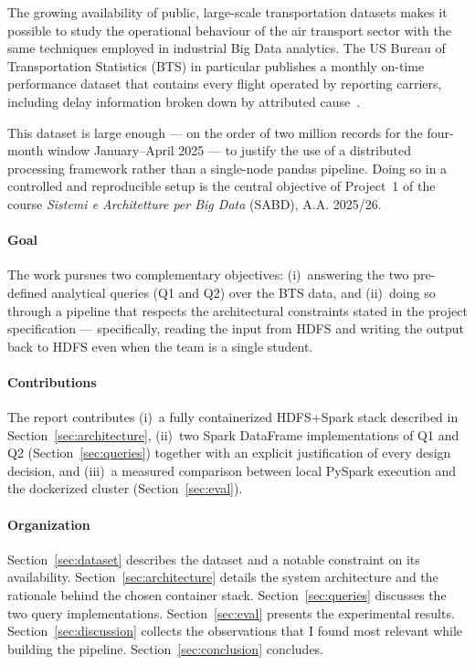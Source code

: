 \documentclass[conference]{IEEEtran}
\begin{document}
The growing availability of public, large-scale transportation
datasets makes it possible to study the operational behaviour of
the air transport sector with the same techniques employed in
industrial Big Data analytics. The US Bureau of Transportation
Statistics (BTS) in particular publishes a monthly on-time
performance dataset that contains every flight operated by
reporting carriers, including delay information broken down by
attributed cause~\cite{bts}.

This dataset is large enough --- on the order of two million
records for the four-month window January--April 2025 --- to
justify the use of a distributed processing framework rather than a
single-node pandas pipeline. Doing so in a controlled and
reproducible setup is the central objective of Project~1 of the
course \emph{Sistemi e Architetture per Big Data} (SABD),
A.A. 2025/26.

\paragraph{Goal}
The work pursues two complementary objectives: (i)~answering the
two pre-defined analytical queries (Q1 and Q2) over the BTS data,
and (ii)~doing so through a pipeline that respects the
architectural constraints stated in the project specification ---
specifically, reading the input from HDFS and writing the output
back to HDFS even when the team is a single student.

\paragraph{Contributions}
The report contributes (i)~a fully containerized HDFS+Spark stack
described in Section~\ref{sec:architecture}, (ii)~two Spark
DataFrame implementations of Q1 and Q2 (Section~\ref{sec:queries})
together with an explicit justification of every design decision,
and (iii)~a measured comparison between local PySpark execution
and the dockerized cluster (Section~\ref{sec:eval}).

\paragraph{Organization}
Section~\ref{sec:dataset} describes the dataset and a notable
constraint on its availability. Section~\ref{sec:architecture}
details the system architecture and the rationale behind the chosen
container stack. Section~\ref{sec:queries} discusses the two query
implementations. Section~\ref{sec:eval} presents the experimental
results. Section~\ref{sec:discussion} collects the observations
that I found most relevant while building the pipeline.
Section~\ref{sec:conclusion} concludes.
\end{document}
